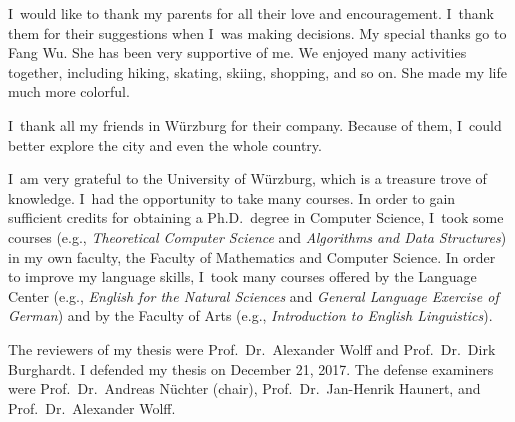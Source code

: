 I~would like to thank my parents
for all their love and encouragement.
I~thank them for their suggestions 
when I~was making decisions.
My special thanks go to Fang Wu.
She has been very supportive of me.
We enjoyed many activities together, 
including hiking, skating, skiing, shopping, and so on.
She made my life much more colorful.

I~thank all my friends in W\"urzburg
for their company.
Because of them, I~could better explore the city 
and even the whole country.

I~am very grateful to the University of W\"urzburg,
which is a treasure trove of knowledge. 
I~had the opportunity to take many courses.
In order to gain sufficient credits for 
obtaining a Ph.D.\ degree in Computer Science,
I~took some courses
(e.g., \emph{Theoretical Computer Science}
and \emph{Algorithms and Data Structures})
in my own faculty, 
the Faculty of Mathematics and Computer Science.
%
In order to improve my language skills,
I~took many courses
offered by the Language Center
(e.g., \emph{English for the Natural Sciences} 
and \emph{General Language Exercise of German})
and by the Faculty of Arts 
(e.g., \emph{Introduction to English Linguistics}).


The reviewers of my thesis were
Prof.\ Dr.\ Alexander Wolff and Prof.\ Dr.\ Dirk Burghardt.
I defended my thesis on December 21, 2017.
The defense examiners were Prof.\ Dr.\ Andreas N\"uchter (chair),
Prof.\ Dr.\ Jan-Henrik Haunert, and Prof.\ Dr.\ Alexander Wolff.

